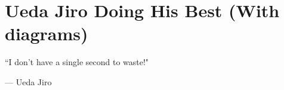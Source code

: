 
\setcounter{footnote}{0}
\setcounter{endnote}{0}

\chapter{Ueda Jiro Doing His Best (With diagrams)}
\epigraph{``I don't have a single second to waste!"}{--- \textup{Ueda Jiro}}

\theendnotes